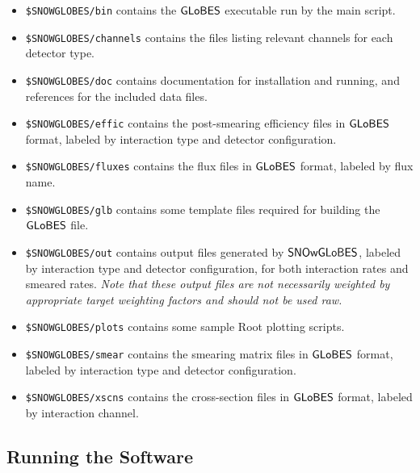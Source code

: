 \documentclass[12pt]{article}
\newcommand{\globes}{\sf{GLoBES}}
\newcommand{\snowglobes}{\sf{SNOwGLoBES}}
\begin{document}
\begin{itemize}

\item \texttt{\$SNOWGLOBES/bin}  contains the $\globes$ executable run by the main script.

\item \texttt{\$SNOWGLOBES/channels}  contains the
files listing relevant channels for each detector type.

\item \texttt{\$SNOWGLOBES/doc}  contains documentation for installation and running, and references for the included data files.


\item \texttt{\$SNOWGLOBES/effic}  contains the
 post-smearing efficiency files in $\globes$ format, labeled by interaction type and detector configuration.

\item \texttt{\$SNOWGLOBES/fluxes}  contains the flux files in $\globes$ format, labeled by flux name.

\item \texttt{\$SNOWGLOBES/glb}  contains some template files required for building the $\globes$ file.

\item \texttt{\$SNOWGLOBES/out} contains output files generated by
  $\snowglobes$, labeled by interaction type and detector configuration,
  for both interaction rates and smeared rates.  \textit{Note that these output files are
  not necessarily weighted by appropriate target weighting factors and
  should not be used raw.}

\item \texttt{\$SNOWGLOBES/plots} contains some sample Root plotting scripts.

\item \texttt{\$SNOWGLOBES/smear}  contains the smearing matrix files in $\globes$ format, labeled by interaction type and detector configuration.

\item \texttt{\$SNOWGLOBES/xscns}  contains the cross-section files in $\globes$ format, labeled by interaction channel.



\end{itemize}


\subsection{Running the Software}
\end{document}
